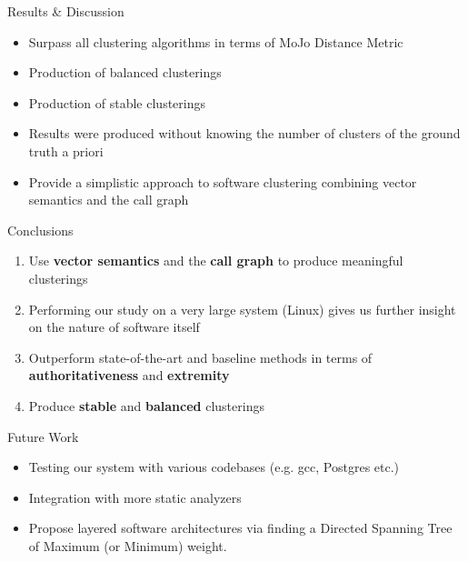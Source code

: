 \documentclass{beamer}
\begin{document}
\begin{frame}{Results \& Discussion}

\begin{itemize}
    \item<1-> Surpass all clustering algorithms in terms of MoJo Distance Metric
    \item<2-> Production of balanced clusterings 
    \item<3-> Production of stable clusterings 
    \item<4-> Results were produced without knowing the number of clusters of the ground truth a priori
    \item<5-> Provide a simplistic approach to software clustering combining vector semantics and the call graph
\end{itemize}
    
\end{frame}

\begin{frame}{Conclusions}

\begin{enumerate}
    \item<1-> Use \textbf{vector semantics} and the \textbf{call graph} to produce meaningful clusterings
    \item<2-> Performing our study on a very large system (Linux) gives us further insight on the nature of software itself
    \item<3-> Outperform state-of-the-art and baseline methods in terms of \textbf{authoritativeness} and \textbf{extremity}
    \item<4-> Produce \textbf{stable} and \textbf{balanced} clusterings 
\end{enumerate}
    
\end{frame}

\begin{frame}{Future Work}

\begin{itemize}
    \item Testing our system with various codebases (e.g. gcc, Postgres etc.)
    \item Integration with more static analyzers 
    \item Propose layered software architectures via finding a Directed Spanning Tree of Maximum (or Minimum) weight. 
\end{itemize}
    
\end{frame}
\end{document}
